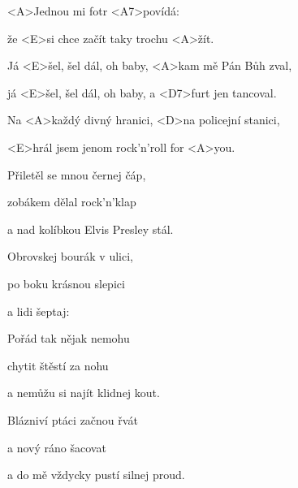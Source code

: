 

\zs
<A>Jednou mi fotr <A7>povídá:


že <E>si chce začít taky trochu <A>žít.

\ks

\zr
Já <E>šel, šel dál, oh baby, <A>kam mě Pán Bůh zval,

já <E>šel, šel dál, oh baby, a <D7>furt jen tancoval.

Na <A>každý divný hranici, <D>na policejní stanici,

<E>hrál jsem jenom rock'n'roll for <A>you.
\kr

\zs
Přiletěl se mnou černej čáp,

zobákem dělal rock'n'klap

a nad kolíbkou Elvis Presley stál.

Obrovskej bourák v ulici,

po boku krásnou slepici

a lidi šeptaj: 
\ks

\zr \kr

\zs
Pořád tak nějak nemohu

chytit štěstí za nohu

a nemůžu si najít klidnej kout.

Blázniví ptáci začnou řvát

a nový ráno šacovat

a do mě vždycky pustí silnej proud.
\ks

\zr \kr

\kp





